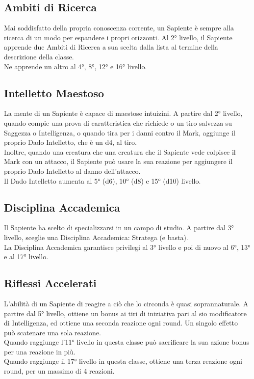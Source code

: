 \subsection{Ambiti di Ricerca}
Mai soddisfatto della propria conoscenza corrente, un Sapiente è sempre alla ricerca di un modo per espandere i propri orizzonti. Al 2° livello, il Sapiente apprende due Ambiti di Ricerca a sua scelta dalla lista al termine della descrizione della classe.\\
Ne apprende un altro al 4°, 8°, 12° e 16° livello.

\subsection{Intelletto Maestoso}
La mente di un Sapiente è capace di maestose intuizini. A partire dal 2° livello, quando compie una prova di caratteristica che richiede o un tiro salvezza su Saggezza o Intelligenza, o quando tira per i danni contro il Mark, aggiunge il proprio Dado Intelletto, che è un d4, al tiro. \\
Inoltre, quando una creatura che una creatura che il Sapiente vede colpisce il Mark con un attacco, il Sapiente può usare la sua reazione per aggiungere il proprio Dado Intelletto al danno dell'attacco. \\
Il Dado Intelletto aumenta al 5° (d6), 10° (d8) e 15° (d10) livello.

\subsection{Disciplina Accademica}
Il Sapiente ha scelto di specializzarsi in un campo di studio. A partire dal 3° livello, sceglie una Disciplina Accademica: Stratega (e basta).\\ La Disciplina Accademica garantisce privilegi al 3° livello e poi di nuovo al 6°, 13° e al 17° livello.

\subsection{Riflessi Accelerati}
L'abilità di un Sapiente di reagire a ciò che lo circonda è quasi soprannaturale. A partire dal 5° livello, ottiene un bonus ai tiri di iniziativa pari al sio modificatore di Intelligenza, ed ottiene una seconda reazione ogni round. Un singolo effetto può scatenare una sola reazione. \\
Quando raggiunge l'11° livello in questa classe può sacrificare la sua azione bonus per una reazione in più.\\
Quando raggiunge il 17° livello in questa classe, ottiene una terza reazione ogni round, per un massimo di 4 reazioni.

